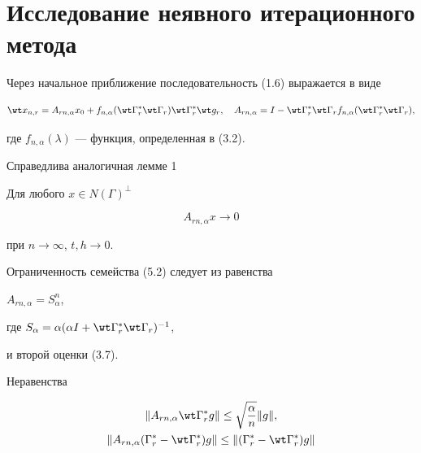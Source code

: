 \section{Исследование неявного итерационного метода}





Через начальное приближение последовательность (1.6) выражается в виде


\begin{equation}


\wt x_{n,r}=A_{rn,\alpha}x_0+f_{n,\alpha}(\wt\Gamma_r^*\wt\Gamma_r)


\wt\Gamma_r^* \wt g_r,\quad A_{rn,\alpha}=


I-\wt\Gamma_r^*\wt\Gamma_r f_{n,\alpha}(\wt \Gamma_r^*\wt\Gamma_r),


\end{equation}


где $f_{n,\alpha}(\lambda)$ --- функция, определенная в (3.2).





Справедлива аналогичная лемме 1





\begin{lem}


Для любого $x\in N(\Gamma)^\bot$


\begin{equation}


A_{rn,\alpha}x\to 0


\end{equation}


при $n \to \infty$, $t, h\to 0$.


\end{lem} 





Ограниченность семейства (5.2) следует из равенства


$A_{rn,\alpha}=S_\alpha^n$,


где $S_\alpha=\alpha(\alpha I+\wt \Gamma_r^* \wt \Gamma_r)^{-1}$,


и второй оценки (3.7).





Неравенства


\begin{gather}


\|A_{rn,\alpha}\wt\Gamma_r^*g\| \le \sqrt{\frac{\alpha}{n}}\|g\|,\\


%


\|A_{rn,\alpha}


(\Gamma_r^*-\wt \Gamma_r^*)g\| \le \|(\Gamma_r^*-\wt \Gamma_r^*)g\|


\end{gather}


